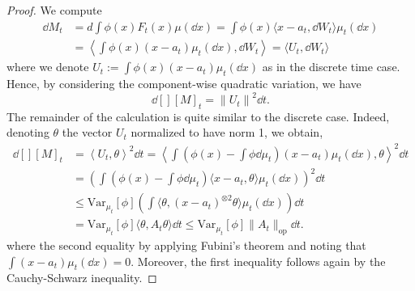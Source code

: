 

\begin{proof}
  We compute
  \begin{align*}
    \dd M_t & = d \int \phi(x) F_t(x) \mu(\dd x) = \int \phi(x) \langle x - a_t, \dd W_t \rangle \mu_t(\dd x)\\
    & = \left\langle \int \phi(x)(x - a_t)\mu_t(\dd x), \dd W_t\right\rangle = \langle U_t, \dd W_t\rangle
  \end{align*}
  where we denote \(U_t := \int \phi(x)(x - a_t)\mu_t(\dd x)\) as in the discrete time case.
  Hence, by considering the component-wise quadratic variation, we have
  \begin{equation}\label{eq:diff_qvar}
    \dd[] [M]_t = \left\| U_t \right\|^2 \dd t.
  \end{equation}
  The remainder of the calculation is quite similar to the discrete case. Indeed, denoting \(\theta\) the vector 
  \(U_t\) normalized to have norm 1, we obtain,
  \begin{equation}\label{eq:red_a}
    \begin{split}
      \dd[] [M]_t & = \left\langle U_t, \theta \right\rangle^2 \dd t
        = \left\langle \int \left(\phi(x) - \int \phi \dd \mu_t\right)(x - a_t)\mu_t(\dd x), \theta\right\rangle^2 \dd t\\
      & = \left(\int \left(\phi(x) - \int \phi \dd \mu_t\right) \langle x - a_t, \theta\rangle \mu_t(\dd x)\right)^2 \dd t\\
      & \le \text{Var}_{\mu_t}[\phi] \left(\int \langle\theta, (x - a_t)^{\otimes 2} \theta\rangle \mu_t(\dd x)\right) \dd t\\
      & = \text{Var}_{\mu_t}[\phi] \langle\theta, A_t \theta\rangle\dd t \le \text{Var}_{\mu_t}[\phi] \|A_t\|_{\text{op}} \dd t.
    \end{split}
  \end{equation}
  where the second equality by applying Fubini's theorem and noting that \(\int (x - a_t) \mu_t(\dd x) = 0\). 
  Moreover, the first inequality follows again by the Cauchy-Schwarz inequality.
\end{proof}

